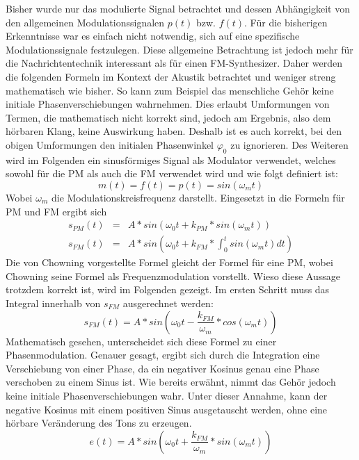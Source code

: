 Bisher wurde nur das modulierte Signal betrachtet und dessen Abhängigkeit von den allgemeinen Modulationssignalen \(p(t)\) bzw. \(f(t)\). Für die bisherigen Erkenntnisse war es einfach nicht notwendig, sich auf eine spezifische Modulationssignale festzulegen. Diese allgemeine Betrachtung ist jedoch mehr für die Nachrichtentechnik interessant als für einen FM-Synthesizer.
Daher werden die folgenden Formeln im Kontext der Akustik betrachtet und weniger streng mathematisch wie bisher. So kann zum Beispiel das menschliche Gehör keine initiale Phasenverschiebungen wahrnehmen. Dies erlaubt Umformungen von Termen, die mathematisch nicht korrekt sind, jedoch am Ergebnis, also dem hörbaren Klang, keine Auswirkung haben. Deshalb ist es auch korrekt, bei den obigen Umformungen den initialen Phasenwinkel $\varphi_0$ zu ignorieren. Des Weiteren wird im Folgenden ein sinusförmiges Signal als Modulator verwendet, welches sowohl für die PM als auch die FM verwendet wird und wie folgt definiert ist:
\begin{equation}
m(t)=f(t)=p(t)=sin(\omega_m t)
\end{equation}
Wobei \(\omega_m\) die Modulationskreisfrequenz darstellt. Eingesetzt in die Formeln für PM und FM ergibt sich
\begin{eqnarray*}
s_{PM}(t)&=&A*sin(\omega_0t+k_{PM}*sin(\omega_m t)) \\
s_{FM}(t)&=&A*sin(\omega_0t+k_{FM}*\int_0^t{sin(\omega_m t)} dt)
\end{eqnarray*}
Die von Chowning vorgestellte Formel gleicht der Formel für eine PM, \cite{chowningPaper} wobei Chowning seine Formel als Frequenzmodulation vorstellt. Wieso diese Aussage trotzdem korrekt ist, wird im Folgenden gezeigt. Im ersten Schritt muss das Integral innerhalb von \(s_{FM}\) ausgerechnet werden:
\begin{equation*}
s_{FM}(t)=A*sin(\omega_0t-\frac{k_{FM}}{\omega_m}*cos(\omega_m t))
\end{equation*}
Mathematisch gesehen, unterscheidet sich diese Formel zu einer Phasenmodulation. Genauer gesagt, ergibt sich durch die Integration eine Verschiebung von einer Phase, da ein negativer Kosinus genau eine Phase verschoben zu einem Sinus ist. Wie bereits erwähnt, nimmt das Gehör jedoch keine initiale Phasenverschiebungen wahr. Unter dieser Annahme, kann der negative Kosinus mit einem positiven Sinus ausgetauscht werden, ohne eine hörbare Veränderung des Tons zu erzeugen.
\begin{equation*}
e(t)=A*sin(\omega_0t+\frac{k_{FM}}{\omega_m}*sin(\omega_m t))
\end{equation*}
